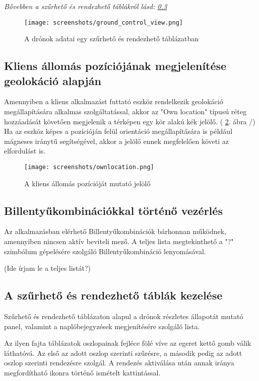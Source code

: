 \textit{
  Bővebben a szűrhető és rendezhető táblákról lásd:
  \ref{filterable_sortable_table}
}

\begin{figure}[H]
  \center
  \texttt{[image: screenshots/ground\_control\_view.png]}
  \caption{A drónok adatai egy szűrhető és rendezhető táblázatban}
  \label{fig:ground_control_view}
\end{figure}

\subsection{Kliens állomás pozíciójának megjelenítése geolokáció alapján}

Amennyiben a kliens alkalmazást futtató eszköz rendelkezik geolokáció
megállapítására alkalmas szolgáltatással, akkor az "Own location" típusú réteg
hozzáadását követően megjelenik a térképen egy kör alakú kék jelölő.
( \ref{fig:ownlocation}. ábra /) Ha az eszköz képes a pozícióján felül
orientáció megállapítására is például mágneses iránytű segítségével, akkor a
jelölő ennek megfelelően követi az elfordulást is.

\begin{figure}[H]
  \center
  \texttt{[image: screenshots/ownlocation.png]}
  \caption{A kliens állomás pozícióját mutató jelölő}
  \label{fig:ownlocation}
\end{figure}

\subsection{Billentyűkombinációkkal történő vezérlés}

Az alkalmazásban elérhető Billentyűkombinációk bárhonnan működnek, amennyiben
nincsen aktív beviteli mező. A teljes lista megtekinthető a "?" szimbólum
gépelésére szolgáló Billentyűkombináció lenyomásával.

(Ide írjam le a teljes listát?)


\subsection{A szűrhető és rendezhető táblák kezelése}
\label{filterable_sortable_table}

Szűrhető és rendezhető táblázaton alapul a drónok részletes állapotát mutató
panel, valamint a naplóbejegyzések megjenítésére szolgáló lista.

Az ilyen fajta táblázatok oszlopainak fejléce fölé víve az egeret kettő gomb
válik láthatóvá. Az első az adott oszlop szerinti szűrésre, a második pedig az
adott oszlop szerinti rendezésre szolgál. A rendezés aktiválása után annak
iránya megfordítható ikonra történő ismételt kattintással.

